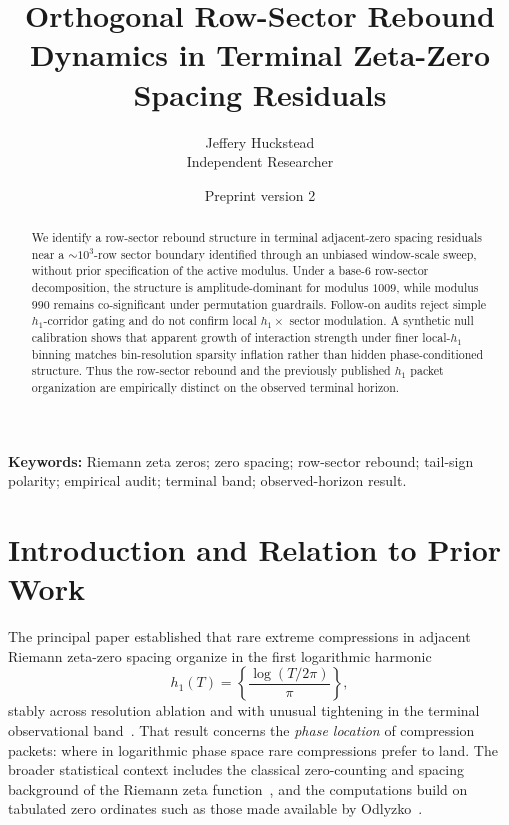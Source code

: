 \documentclass[11pt]{article}
\title{Orthogonal Row-Sector Rebound Dynamics in Terminal Zeta-Zero Spacing Residuals}
\author{Jeffery Huckstead\\Independent Researcher}
\date{Preprint version 2}
\begin{document}
\maketitle

\begin{abstract}
We identify a row-sector rebound structure in terminal adjacent-zero
spacing residuals near a $\sim 10^3$-row sector boundary identified
through an unbiased window-scale sweep, without prior specification of
the active modulus. Under a base-6 row-sector decomposition, the
structure is amplitude-dominant for modulus $1009$, while modulus $990$
remains co-significant under permutation guardrails. Follow-on audits
reject simple $h_1$-corridor gating and do not confirm local
$h_1 \times$ sector modulation. A synthetic null calibration shows that
apparent growth of interaction strength under finer local-$h_1$ binning
matches bin-resolution sparsity inflation rather than hidden
phase-conditioned structure. Thus the row-sector rebound and the
previously published $h_1$ packet organization are empirically distinct
on the observed terminal horizon.
\end{abstract}

\noindent\textbf{Keywords:} Riemann zeta zeros; zero spacing;
row-sector rebound; tail-sign polarity; empirical audit; terminal band;
observed-horizon result.

\section{Introduction and Relation to Prior Work}

The principal paper established that rare extreme compressions in
adjacent Riemann zeta-zero spacing organize in the first logarithmic
harmonic
\begin{equation}
    h_1(T) = \left\{\frac{\log(T/2\pi)}{\pi}\right\},
    \label{eq:h1}
\end{equation}
stably across resolution ablation and with unusual tightening in the
terminal observational band~\cite{huckstead_h1_principal}. That result
concerns the \emph{phase location} of compression packets: where in
logarithmic phase space rare compressions prefer to land. The broader
statistical context includes the classical zero-counting and spacing
background of the Riemann zeta
function~\cite{riemann1859,montgomery1973,mehta_random_matrices}, and
the computations build on tabulated zero ordinates such as those made
available by Odlyzko~\cite{odlyzko_tables}.
\end{document}
